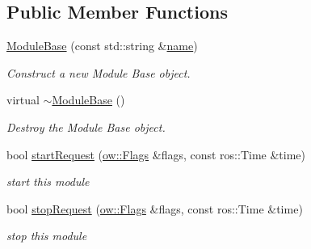 \subsection*{Public Member Functions}
\begin{DoxyCompactItemize}
\item 
\hyperlink{classow_1_1ModuleBase_a7aca9ce4c0ae4b9146ff06dee531244a}{Module\+Base} (const std\+::string \&\hyperlink{classow_1_1GenericModuleBase_a4b712883728cdbab7779e27f9a23689c}{name})
\begin{DoxyCompactList}\small\item\em Construct a new Module Base object. \end{DoxyCompactList}\item 
virtual \hyperlink{classow_1_1ModuleBase_af6c285f10a9f5894829f9a38171c0504}{$\sim$\+Module\+Base} ()\hypertarget{classow_1_1ModuleBase_af6c285f10a9f5894829f9a38171c0504}{}\label{classow_1_1ModuleBase_af6c285f10a9f5894829f9a38171c0504}

\begin{DoxyCompactList}\small\item\em Destroy the Module Base object. \end{DoxyCompactList}\item 
bool \hyperlink{classow_1_1ModuleBase_a74244121887e5f004b3644dcb30bcfca}{start\+Request} (\hyperlink{classow__core_1_1Flags}{ow\+::\+Flags} \&flags, const ros\+::\+Time \&time)
\begin{DoxyCompactList}\small\item\em start this module \end{DoxyCompactList}\item 
bool \hyperlink{classow_1_1ModuleBase_a433fd5354b03f8b9bf960ca917f6f457}{stop\+Request} (\hyperlink{classow__core_1_1Flags}{ow\+::\+Flags} \&flags, const ros\+::\+Time \&time)
\begin{DoxyCompactList}\small\item\em stop this module \end{DoxyCompactList}\end{DoxyCompactItemize}

